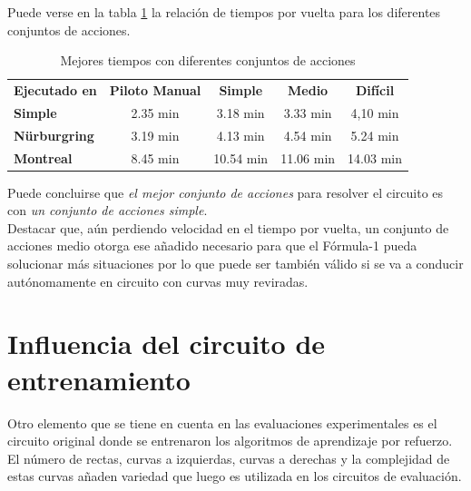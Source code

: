 Puede verse en la tabla \ref{tab:tiempos_acciones} la relación de tiempos por vuelta para los diferentes conjuntos de acciones.

\begin{table}[ht!]
\centering
\begin{tabular}{|l|c|c|c|c|}
\hline
\rowcolor[HTML]{EFEFEF} 
\multicolumn{5}{|c|}{\cellcolor[HTML]{EFEFEF}\textbf{Mejor tiempo / Acciones}}                                              \\ \hline
\rowcolor[HTML]{EFEFEF} 
\textbf{Ejecutado en}                        & \textbf{Piloto Manual} & \textbf{Simple} & \textbf{Medio} & \textbf{Difícil} \\ \hline
\cellcolor[HTML]{EFEFEF}\textbf{Simple}      & 2.35 min               & 3.18 min        & 3.33 min       & 4,10 min         \\ \hline
\cellcolor[HTML]{EFEFEF}\textbf{Nürburgring} & 3.19 min               & 4.13 min        & 4.54 min       & 5.24 min         \\ \hline
\cellcolor[HTML]{EFEFEF}\textbf{Montreal}    & 8.45 min               & 10.54 min       & 11.06 min      & 14.03 min        \\ \hline
\end{tabular}
\caption{Mejores tiempos con diferentes conjuntos de acciones}
\label{tab:tiempos_acciones}
\end{table}

Puede concluirse que \textit{el mejor conjunto de acciones} para resolver el circuito es con \textit{un conjunto de acciones simple}.\\

Destacar que, aún perdiendo velocidad en el tiempo por vuelta, un conjunto de acciones medio otorga ese añadido necesario para que el Fórmula-1 pueda solucionar más situaciones por lo que puede ser también válido si se va a conducir autónomamente en circuito con curvas muy reviradas.\\


\section{Influencia del circuito de entrenamiento}

Otro elemento que se tiene en cuenta en las evaluaciones experimentales es el circuito original donde se entrenaron los algoritmos de aprendizaje por refuerzo. El número de rectas, curvas a izquierdas, curvas a derechas y la complejidad de estas curvas añaden variedad que luego es utilizada en los circuitos de evaluación.\\

